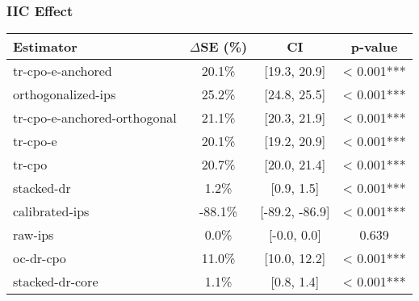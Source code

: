 \subsubsection{IIC Effect}
\begin{tabular}{l|ccc}
\toprule
Estimator & $\Delta$SE (\%) & CI & p-value \\
\midrule
tr-cpo-e-anchored & 20.1\% & [19.3, 20.9] & < 0.001*** \\
orthogonalized-ips & 25.2\% & [24.8, 25.5] & < 0.001*** \\
tr-cpo-e-anchored-orthogonal & 21.1\% & [20.3, 21.9] & < 0.001*** \\
tr-cpo-e & 20.1\% & [19.2, 20.9] & < 0.001*** \\
tr-cpo & 20.7\% & [20.0, 21.4] & < 0.001*** \\
stacked-dr & 1.2\% & [0.9, 1.5] & < 0.001*** \\
calibrated-ips & -88.1\% & [-89.2, -86.9] & < 0.001*** \\
raw-ips & 0.0\% & [-0.0, 0.0] & 0.639 \\
oc-dr-cpo & 11.0\% & [10.0, 12.2] & < 0.001*** \\
stacked-dr-core & 1.1\% & [0.8, 1.4] & < 0.001*** \\
\bottomrule
\end{tabular}